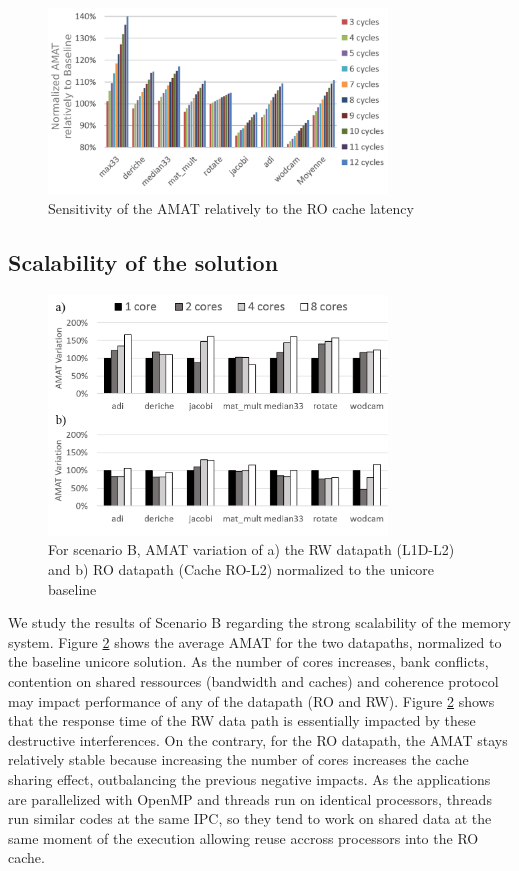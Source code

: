 \documentclass[sigconf]{acmart}
\begin{document}
\begin{figure}
    \centering
    \includegraphics[width=9cm]{./images/rolatency.png}
    \caption{Sensitivity of the AMAT relatively to the RO cache latency}
    \label{amatVariation}
\end{figure}


\subsection{Scalability of the solution}
\begin{figure}
    \centering
    \includegraphics[width=9cm]{./images/scalabilityAMAT.png}
    \caption{For scenario B, AMAT variation of a) the RW datapath (L1D-L2) and b) RO datapath (Cache RO-L2) normalized to the unicore baseline}
    \label{amatVariation}
\end{figure}

We study the results of Scenario B regarding the strong scalability of the memory system. Figure \ref{amatVariation} shows the average AMAT for the two datapaths, normalized to the baseline unicore solution. As the number of cores increases, bank conflicts, contention on shared ressources (bandwidth and caches) and coherence protocol may impact performance of any of the datapath (RO and RW). Figure \ref{amatVariation} shows that the response time of the RW data path is essentially impacted by these destructive interferences. On the contrary, for the RO datapath, the AMAT stays relatively stable because increasing the number of cores increases the cache sharing effect, outbalancing the previous negative impacts. As the applications are parallelized with OpenMP and threads run on identical processors, threads run similar codes at the same IPC, so they tend to work on shared data at the same moment of the execution allowing reuse accross processors into the RO cache.
\end{document}
